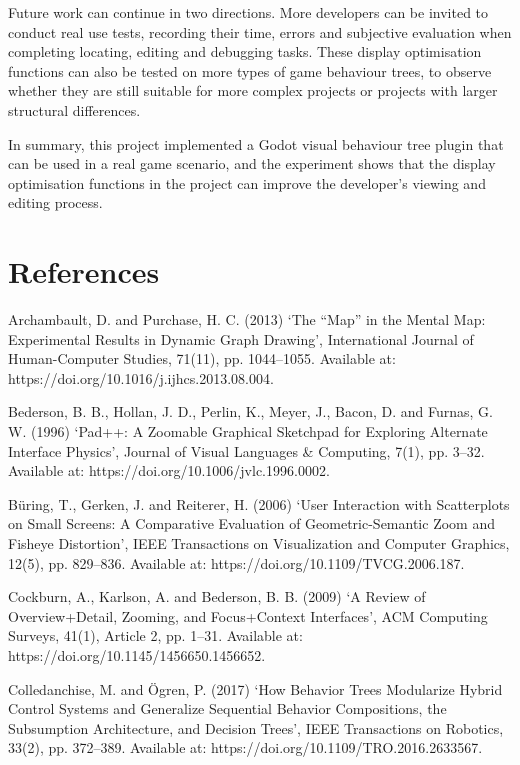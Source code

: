\documentclass[11pt,a4paper,oneside,extrafontsizes]{memoir}
\begin{document}
Future work can continue in two directions. More developers can be invited to conduct real use tests, recording their time, errors and subjective evaluation when completing locating, editing and debugging tasks. These display optimisation functions can also be tested on more types of game behaviour trees, to observe whether they are still suitable for more complex projects or projects with larger structural differences.

In summary, this project implemented a Godot visual behaviour tree plugin that can be used in a real game scenario, and the experiment shows that the display optimisation functions in the project can improve the developer's viewing and editing process.

\chapter*{References}

Archambault, D. and Purchase, H. C. (2013) ‘The “Map” in the Mental Map: Experimental Results in Dynamic Graph Drawing’, International Journal of Human-Computer Studies, 71(11), pp. 1044–1055. Available at: https://doi.org/10.1016/j.ijhcs.2013.08.004.

Bederson, B. B., Hollan, J. D., Perlin, K., Meyer, J., Bacon, D. and Furnas, G. W. (1996) ‘Pad++: A Zoomable Graphical Sketchpad for Exploring Alternate Interface Physics’, Journal of Visual Languages \& Computing, 7(1), pp. 3–32. Available at: https://doi.org/10.1006/jvlc.1996.0002.

Büring, T., Gerken, J. and Reiterer, H. (2006) ‘User Interaction with Scatterplots on Small Screens: A Comparative Evaluation of Geometric-Semantic Zoom and Fisheye Distortion’, IEEE Transactions on Visualization and Computer Graphics, 12(5), pp. 829–836. Available at: https://doi.org/10.1109/TVCG.2006.187.

Cockburn, A., Karlson, A. and Bederson, B. B. (2009) ‘A Review of Overview+Detail, Zooming, and Focus+Context Interfaces’, ACM Computing Surveys, 41(1), Article 2, pp. 1–31. Available at: https://doi.org/10.1145/1456650.1456652.

Colledanchise, M. and Ögren, P. (2017) ‘How Behavior Trees Modularize Hybrid Control Systems and Generalize Sequential Behavior Compositions, the Subsumption Architecture, and Decision Trees’, IEEE Transactions on Robotics, 33(2), pp. 372–389. Available at: https://doi.org/10.1109/TRO.2016.2633567.
\end{document}
